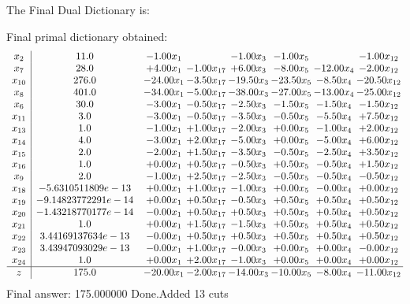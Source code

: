 \documentclass[8pt]{article}
\begin{document}
The Final Dual Dictionary is: 

 Final primal dictionary obtained: 
\[\begin{array}{c| c c@{\hskip 2pt} c@{\hskip 2pt} c@{\hskip 2pt} c@{\hskip 2pt} c@{\hskip 2pt} c@{\hskip 2pt} }
 x_{2}   &  11.0 & -1.00 x_{1} &   & -1.00 x_{3} & -1.00 x_{5} &   & -1.00 x_{12}\\
 x_{7}   &  28.0 & +  4.00 x_{1} & -1.00 x_{17} & +  6.00 x_{3} & -8.00 x_{5} & -12.00 x_{4} & -2.00 x_{12}\\
 x_{10}   &  276.0 & -24.00 x_{1} & -3.50 x_{17} & -19.50 x_{3} & -23.50 x_{5} & -8.50 x_{4} & -20.50 x_{12}\\
 x_{8}   &  401.0 & -34.00 x_{1} & -5.00 x_{17} & -38.00 x_{3} & -27.00 x_{5} & -13.00 x_{4} & -25.00 x_{12}\\
 x_{6}   &  30.0 & -3.00 x_{1} & -0.50 x_{17} & -2.50 x_{3} & -1.50 x_{5} & -1.50 x_{4} & -1.50 x_{12}\\
 x_{11}   &  3.0 & -3.00 x_{1} & -0.50 x_{17} & -3.50 x_{3} & -0.50 x_{5} & -5.50 x_{4} & +  7.50 x_{12}\\
 x_{13}   &  1.0 & -1.00 x_{1} & +  1.00 x_{17} & -2.00 x_{3} & +  0.00 x_{5} & -1.00 x_{4} & +  2.00 x_{12}\\
 x_{14}   &  4.0 & -3.00 x_{1} & +  2.00 x_{17} & -5.00 x_{3} & +  0.00 x_{5} & -5.00 x_{4} & +  6.00 x_{12}\\
 x_{15}   &  2.0 & -2.00 x_{1} & +  1.50 x_{17} & -3.50 x_{3} & -0.50 x_{5} & -2.50 x_{4} & +  3.50 x_{12}\\
 x_{16}   &  1.0 & +  0.00 x_{1} & +  0.50 x_{17} & -0.50 x_{3} & +  0.50 x_{5} & -0.50 x_{4} & +  1.50 x_{12}\\
 x_{9}   &  2.0 & -1.00 x_{1} & +  2.50 x_{17} & -2.50 x_{3} & -0.50 x_{5} & -0.50 x_{4} & -0.50 x_{12}\\
 x_{18}   &  -5.6310511809e-13 & +  0.00 x_{1} & +  1.00 x_{17} & -1.00 x_{3} & +  0.00 x_{5} & -0.00 x_{4} & +  0.00 x_{12}\\
 x_{19}   &  -9.14823772291e-14 & +  0.00 x_{1} & +  0.50 x_{17} & -0.50 x_{3} & +  0.50 x_{5} & +  0.50 x_{4} & +  0.50 x_{12}\\
 x_{20}   &  -1.43218770177e-14 & -0.00 x_{1} & +  0.50 x_{17} & +  0.50 x_{3} & +  0.50 x_{5} & +  0.50 x_{4} & +  0.50 x_{12}\\
 x_{21}   &  1.0 & +  0.00 x_{1} & +  1.50 x_{17} & -1.50 x_{3} & +  0.50 x_{5} & +  0.50 x_{4} & +  0.50 x_{12}\\
 x_{22}   &  3.44169137634e-13 & -0.00 x_{1} & +  0.50 x_{17} & +  0.50 x_{3} & +  0.50 x_{5} & +  0.50 x_{4} & +  0.50 x_{12}\\
 x_{23}   &  3.43947093029e-13 & -0.00 x_{1} & +  1.00 x_{17} & -0.00 x_{3} & +  0.00 x_{5} & +  0.00 x_{4} & -0.00 x_{12}\\
 x_{24}   &  1.0 & +  0.00 x_{1} & +  2.00 x_{17} & -1.00 x_{3} & +  0.00 x_{5} & +  0.00 x_{4} & +  0.00 x_{12}\\
\hline
z    &  175.0 & -20.00 x_{1} & -2.00 x_{17} & -14.00 x_{3} & -10.00 x_{5} & -8.00 x_{4} & -11.00 x_{12}\\
\end{array}\]
 Final answer: 175.000000 
Done.Added 13 cuts 
\end{document}
